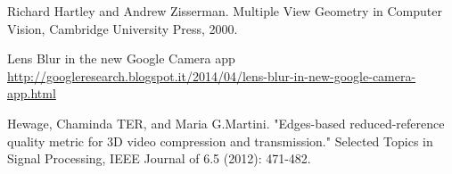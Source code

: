 
\begin{thebibliography}{99}

 Richard Hartley and Andrew Zisserman. Multiple View Geometry in Computer Vision, Cambridge University Press, 2000.

 Lens Blur in the new Google Camera app \newline
\url{http://googleresearch.blogspot.it/2014/04/lens-blur-in-new-google-camera-app.html}

 Hewage, Chaminda TER, and Maria G.Martini. "Edges-based reduced-reference quality metric for 3D video compression and transmission." Selected Topics in Signal Processing, IEEE Journal of 6.5 (2012): 471-482.





\end{thebibliography}
\clearpage
\thispagestyle{empty}